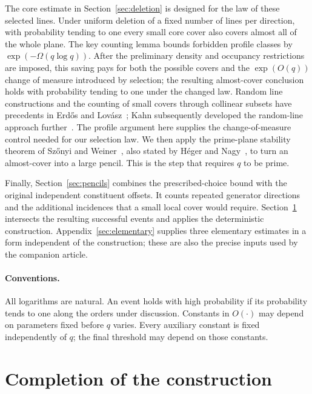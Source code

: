 \documentclass[11pt]{article}
\theoremstyle{definition}
\theoremstyle{remark}
\begin{document}
The core estimate in Section~\ref{sec:deletion} is designed for the law
of these selected lines. Under uniform deletion of a fixed number of
lines per direction, with probability tending to one every small core
cover also covers almost all of the whole plane. The key counting lemma bounds forbidden profile classes by
$\exp(-\Omega(q\log q))$. After the preliminary density and occupancy
restrictions are imposed, this saving pays for both the possible covers
and the $\exp(O(q))$ change of measure introduced by selection; the
resulting almost-cover conclusion holds with probability tending to one
under the changed law. Random line constructions and the counting of small covers through collinear subsets
have precedents in Erd\H{o}s and Lov\'asz~\cite[Section~4]{ErdosLovasz1975};
Kahn subsequently developed the random-line approach
further~\cite{Kahn1992}. The profile argument here supplies the
change-of-measure control needed for our selection law.
We then apply the prime-plane stability theorem of Sz\H{o}nyi and
Weiner~\cite{SzonyiWeiner2012}, also stated by H\'eger and
Nagy~\cite{HegerNagy2017}, to turn an almost-cover into a large pencil.
This is the step that requires $q$ to be prime.

Finally, Section~\ref{sec:pencils} combines the prescribed-choice bound
with the original independent constituent offsets. It counts repeated
generator directions and the additional incidences that a small local
cover would require. Section~\ref{sec:assembly} intersects the resulting
successful events and applies the deterministic construction.
Appendix~\ref{sec:elementary} supplies three elementary estimates in a
form independent of the construction; these are also the precise inputs
used by the companion article.

\paragraph{Conventions.}
All logarithms are natural. An event holds with high probability if its
probability tends to one along the orders under discussion. Constants
in $O(\cdot)$ may depend on parameters fixed before $q$ varies. Every
auxiliary constant is fixed independently of $q$; the final threshold
may depend on those constants.







\section{Completion of the construction}\label{sec:assembly}
\end{document}
